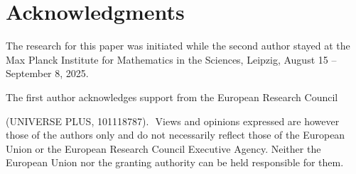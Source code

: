 \documentclass[12pt,a4paper]{amsart}
\theoremstyle{definition}
\begin{document}
\section*{Acknowledgments}
\small{The research for this paper was initiated while the second author stayed at the Max Planck Institute for Mathematics in the Sciences, Leipzig, August 15 -- September 8, 2025. 

\medskip

The first author acknowledges support
from the European Research Council~\begin{footnotesize}(UNIVERSE PLUS, 101118787). 
$\!\!$ Views and opinions expressed
are however those of the authors only and do not necessarily reflect those of the European Union or the 
European
Research Council Executive Agency. Neither the European Union nor the granting authority
can be held responsible for them. \end{footnotesize}}
\end{document}
